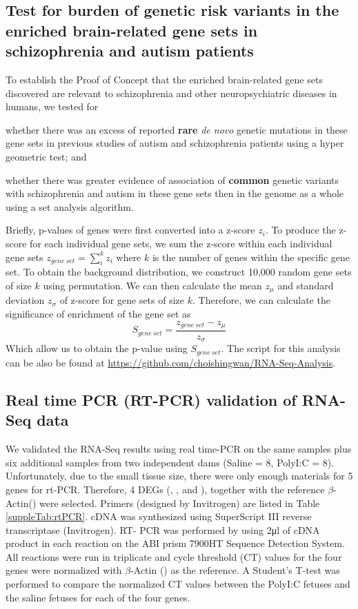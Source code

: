 \subsection{Test for burden of genetic risk variants in the enriched brain-related gene sets in schizophrenia and autism patients }
To establish the Proof of Concept that the enriched brain-related gene sets discovered are relevant to schizophrenia and other neuropsychiatric diseases in humans, we tested for 
\begin{enumerate*}[label=\roman*)]
	\item whether there was an excess of reported \textbf{rare} \textit{de novo} genetic mutations in these gene sets in previous studies of autism and schizophrenia patients\cite{Fromer2014,ORoak2012,Sanders2012,Neale2012} using a hyper geometric test; and
	\item whether there was greater evidence of association of \textbf{common} genetic variants with schizophrenia\cite{Ripke2013} and autism\cite{Anney2010a} in these gene sets then in the genome as a whole using a set analysis algorithm\cite{Ideker2002}. 
\end{enumerate*}
Briefly, p-values of genes were first converted into a z-score $z_i$. 
To produce the z-score for each individual gene sets, we sum the z-score within each individual gene sets $z_{gene\ set} = \sum_i^kz_i$ where $k$ is the number of genes within the specific gene set. 
To obtain the background distribution, we construct 10,000 random gene sets of size $k$ using permutation. 
We can then calculate the mean $z_\mu$ and standard deviation $z_\sigma$ of z-score for gene sets of size $k$.
Therefore, we can calculate the significance of enrichment of the gene set as
$$
S_{gene\ set}=\frac{z_{gene\ set}-z_\mu}{z_\sigma}
$$
Which allow us to obtain the p-value using $S_{gene\ set}$. 
The script for this analysis can be also be found at \url{https://github.com/choishingwan/RNA-Seq-Analysis}. 


\subsection{Real time PCR (RT-PCR) validation of RNA-Seq data}
We validated the RNA-Seq results using real time-PCR on the same samples plus six additional samples from two independent dams (Saline = 8, PolyI:C = 8).
Unfortunately, due to the small tissue size, there were only enough materials for 5 genes for rt-PCR. 
Therefore, 4 DEGs (, ,  and ), together with the reference $\beta$-Actin() were selected. 
Primers (designed by Invitrogen) are listed in Table \ref{suppleTab:rtPCR}. 
cDNA was synthesized using SuperScript III reverse transcriptase (Invitrogen). 
RT- PCR was performed by using 2μl of cDNA product in each reaction on the ABI prism 7900HT Sequence Detection System.
All reactions were run in triplicate and cycle threshold (CT) values for the four genes were normalized with $\beta$-Actin () as the reference. 
A Student’s T-test was performed to compare the normalized CT values between the PolyI:C fetuses and the saline fetuses for each of the four genes\cite{Yuan2006}.


